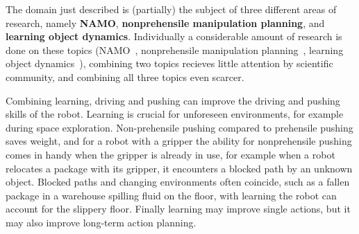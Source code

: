 





The domain just described is (partially) the subject of three different areas of research, namely \textbf{\ac{NAMO}}, \textbf{nonprehensile manipulation planning}, and \textbf{learning object dynamics}. Individually a considerable amount of research is done on these topics (\ac{NAMO}~\cite{wang_affordancebased_2020,lavalle_planning_2006,elbanhawi_samplingbased_2014,kingston_samplingbased_2018,chen_fast_2018,ellis_navigation_2022}, nonprehensile manipulation planning~\cite{arruda_uncertainty_2017,mericli_pushmanipulation_2015,toussaint_sequenceofconstraints_2022,stuber_let_2020,stuber_featurebased_2018,bauza_dataefficient_2018}, learning object dynamics~\cite{seegmiller_vehicle_2013,cong_selfadapting_2020}), combining two topics recieves little attention by scientific community, and combining all three topics even scarcer.\bs


Combining learning, driving and pushing can improve the driving and pushing skills of the robot. Learning is crucial for unforeseen environments, for example during space exploration. Non-prehensile pushing compared to prehensile pushing saves weight, and for a robot with a gripper the ability for nonprehensile pushing comes in handy when the gripper is already in use, for example when a robot relocates a package with its gripper, it encounters a blocked path by an unknown object. Blocked paths and changing environments often coincide, such as a fallen package in a warehouse spilling fluid on the floor, with learning the robot can account for the slippery floor. Finally learning may improve single actions, but it may also improve long-term action planning.\bs
{}


